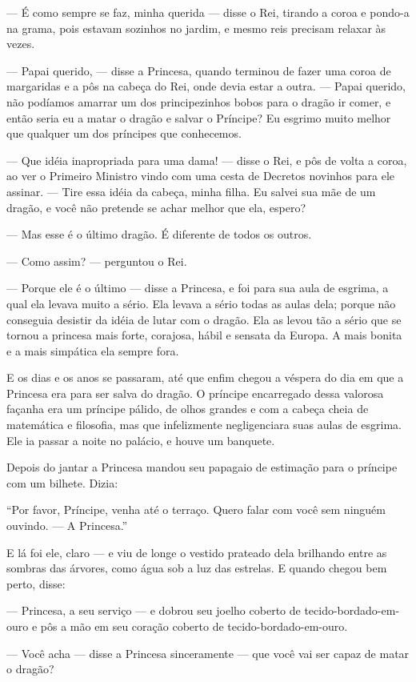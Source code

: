 — É como sempre se faz, minha querida — disse o Rei, tirando a coroa e
pondo-a na grama, pois estavam sozinhos no jardim, e mesmo reis
precisam relaxar às vezes.

— Papai querido, — disse a Princesa, quando terminou de fazer uma
coroa de margaridas e a pôs na cabeça do Rei, onde devia estar a
outra. — Papai querido, não podíamos amarrar um dos principezinhos
bobos para o dragão ir comer, e então seria eu a matar o dragão e
salvar o Príncipe? Eu esgrimo muito melhor que qualquer um dos
príncipes que conhecemos. 

— Que idéia inapropriada para uma dama! — disse o Rei, e pôs de volta
a coroa, ao ver o Primeiro Ministro vindo com uma cesta de Decretos
novinhos para ele assinar. — Tire essa idéia da cabeça, minha filha.
Eu salvei sua mãe de um dragão, e você não pretende se achar melhor
que ela, espero?

— Mas esse é o último dragão. É diferente de todos os outros.

— Como assim? — perguntou o Rei.

— Porque ele é o último — disse a Princesa, e foi para sua aula de
esgrima, a qual ela levava muito a sério. Ela levava a sério todas as
aulas dela; porque não conseguia desistir da idéia de lutar com o
dragão. Ela as levou tão a sério que se tornou a princesa mais forte,
corajosa, hábil e sensata da Europa. A mais bonita e a mais simpática
ela sempre fora. 

E os dias e os anos se passaram, até que enfim chegou a véspera do dia
em que a Princesa era para ser salva do dragão. O príncipe
encarregado dessa valorosa façanha era um príncipe pálido, de olhos
grandes e com a cabeça cheia de matemática e filosofia, mas que
infelizmente negligenciara suas aulas de esgrima. Ele ia passar a
noite no palácio, e houve um banquete.

Depois do jantar a Princesa mandou seu papagaio de estimação para o
príncipe com um bilhete. Dizia: 

“Por favor, Príncipe, venha até o terraço. Quero falar com você sem
ninguém ouvindo. — A Princesa.”

E lá foi ele, claro — e viu de longe o vestido prateado dela brilhando
entre as sombras das árvores, como água sob a luz das estrelas. E
quando chegou bem perto, disse:

— Princesa, a seu serviço — e dobrou seu joelho coberto de
tecido-bordado-em-ouro e pôs a mão em seu coração coberto de
tecido-bordado-em-ouro.

— Você acha — disse a Princesa sinceramente — que você vai ser capaz
de matar o dragão?

